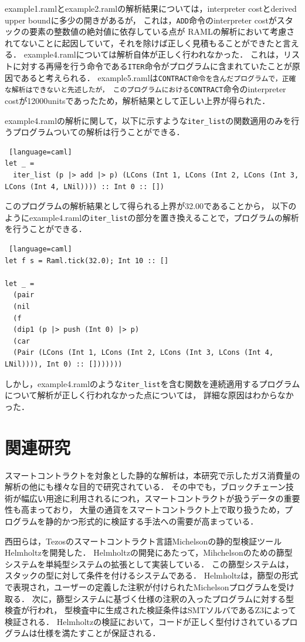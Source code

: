 \documentclass{kuisthesis}
\begin{document}
example1.ramlとexample2.ramlの解析結果については，interpreter costとderived upper boundに多少の開きがあるが，
これは，{\tt ADD}命令のinterpreter costがスタックの要素の整数値の絶対値に依存している点が
RAMLの解析において考慮されてないことに起因していて，それを除けば正しく見積もることができたと言える．
example4.ramlについては解析自体が正しく行われなかった．
これは，リストに対する再帰を行う命令である{\tt ITER}命令がプログラムに含まれていたことが原因であると考えられる．
example5.ramlは{\tt CONTRACT命令を含んだプログラムで，正確な解析はできないと先述したが，
このプログラムにおけるCONTRACT}命令のinterpreter costが12000unitsであったため，解析結果として正しい上界が得られた．

example4.ramlの解析に関して，以下に示すような{\tt iter\_list}の関数適用のみを行うプログラムついての解析は行うことができる．
\begin{lstlisting} [language=caml]
let _ =
  iter_list (p |> add |> p) (LCons (Int 1, LCons (Int 2, LCons (Int 3, LCons (Int 4, LNil)))) :: Int 0 :: [])
\end{lstlisting}
このプログラムの解析結果として得られる上界が32.00であることから，
以下のようにexample4.ramlの{\tt iter\_list}の部分を置き換えることで，プログラムの解析を行うことができる．
\begin{lstlisting} [language=caml]
let f s = Raml.tick(32.0); Int 10 :: []

let _ =
  (pair
  (nil
  (f
  (dip1 (p |> push (Int 0) |> p)
  (car
  (Pair (LCons (Int 1, LCons (Int 2, LCons (Int 3, LCons (Int 4, LNil)))), Int 0) :: []))))))
\end{lstlisting}

しかし，example4.ramlのような{\tt iter\_list}を含む関数を連続適用するプログラムについて解析が正しく行われなかった点については，
詳細な原因はわからなかった．

\section{関連研究} \label{sec-relate}
スマートコントラクトを対象とした静的な解析は，本研究で示したガス消費量の解析の他にも様々な目的で研究されている．
その中でも，ブロックチェーン技術が幅広い用途に利用されるにつれ，スマートコントラクトが扱うデータの重要性も高まっており，
大量の通貨をスマートコントラクト上で取り扱うため，プログラムを静的かつ形式的に検証する手法への需要が高まっている．

西田らは，Tezosのスマートコントラクト言語Michelsonの静的型検証ツールHelmholtzを開発した\cite{helmholtz}\cite{hurui}．
Helmholtzの開発にあたって，Mihchelsonのための篩型システムを単純型システムの拡張として実装している．
この篩型システムは，スタックの型に対して条件を付けるシステムである．
Helmholtzは，篩型の形式で表現され，ユーザーの定義した注釈が付けられたMichelsonプログラムを受け取る．
次に，篩型システムに基づく仕様の注釈の入ったプログラムに対する型検査が行われ，
型検査中に生成された検証条件はSMTソルバであるZ3\cite{z3}によって検証される．
Helmholtzの検証において，コードが正しく型付けされているプログラムは仕様を満たすことが保証される．
\end{document}
